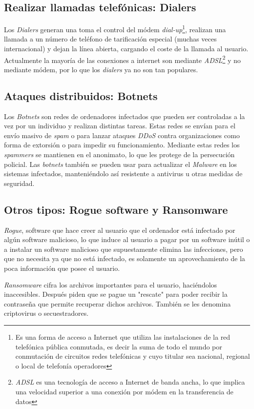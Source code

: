 \subsection{Realizar llamadas telefónicas: Dialers}
Los \textit{Dialers} generan una toma el control del módem \textit{dial-up}\footnote{Es una forma de acceso a Internet que utiliza las instalaciones de la red telefónica pública conmutada, es decir la suma de todo el mundo por conmutación de circuitos redes telefónicas y cuyo titular sea nacional, regional o local de telefonía operadores}, realizan una llamada a un número de teléfono de tarificación especial (muchas veces internacional) y dejan la línea abierta, cargando el coste de la llamada al usuario. Actualmente la mayoría de las conexiones a internet son mediante \textit{ADSL}\footnote{\textit{ADSL} es una tecnología de acceso a Internet de banda ancha, lo que implica una velocidad superior a una conexión por módem en la transferencia de datos} y no mediante módem, por lo que los \textit{dialers} ya no son tan populares.

\subsection{Ataques distribuidos: Botnets}
Los \textit{Botnets} son redes de ordenadores infectados que pueden ser controladas a la vez por un individuo y realizan distintas tareas. Estas redes se envían para el envío masivo de \textit{spam} o para lanzar ataques \textit{DDoS} contra organizaciones como forma de extorsión o para impedir su funcionamiento. Mediante estas redes los \textit{spammers} se mantienen en el anonimato, lo que les protege de la persecución policial. Las \textit{botnets} también se pueden usar para actualizar el \textit{Malware} en los sistemas infectados, manteniéndolo así resistente a antivirus u otras medidas de seguridad.

\subsection{Otros tipos: Rogue software y Ransomware}
\textit{Rogue}, software que hace creer al usuario que el ordenador está infectado por algún software malicioso, lo que induce al usuario a pagar por un software inútil o a instalar un software malicioso que supuestamente elimina las infecciones, pero que no necesita ya que no está infectado, es solamente un aprovechamiento de la poca información que posee el usuario.

\textit{Ransomware} cifra los archivos importantes para el usuario, haciéndolos inaccesibles. Después piden que se pague un "rescate" para poder recibir la contraseña que permite recuperar dichos archivos. También se les denomina criptovirus o secuestradores.

